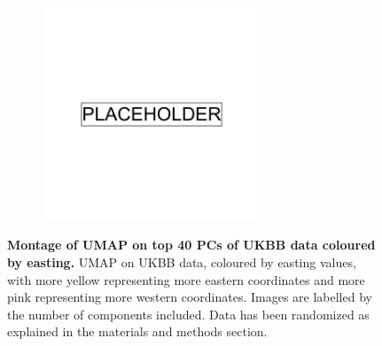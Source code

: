 \begin{figure}[ht]
    \centering
    \begin{subfigure}{\textwidth}
    \includegraphics[width=0.7\textwidth]{placeholder.png}
    \end{subfigure}
    \caption[Montage of UMAP on top 40 PCs of UKBB data coloured by easting]{\textbf{Montage of UMAP on top 40 PCs of UKBB data coloured by easting.} UMAP on UKBB data, coloured by easting values, with more yellow representing more eastern coordinates and more pink representing more western coordinates. Images are labelled by the number of components included. Data has been randomized as explained in the materials and methods section.}
    \label{fig:supp_montage_ukbb_ew}
\end{figure}

\newpage

